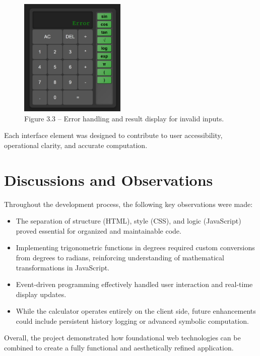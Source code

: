 \documentclass[a4paper,12pt,oneside]{report}
\numberwithin{equation}{chapter}
\numberwithin{figure}{chapter}
\numberwithin{table}{chapter}
\begin{document}
\begin{figure}[H]
    \centering
    \includegraphics[width=0.45\textwidth, keepaspectratio]{error_calc.png}
    \caption{Figure 3.3 – Error handling and result display for invalid inputs.}
    \label{fig:Calculator Error Display}
\end{figure}


Each interface element was designed to contribute to user accessibility, operational clarity, and accurate computation.

\bigskip
\noindent
\section{Discussions and Observations}

Throughout the development process, the following key observations were made:
\begin{itemize}
    \item The separation of structure (HTML), style (CSS), and logic (JavaScript) proved essential for organized and maintainable code.
    \item Implementing trigonometric functions in degrees required custom conversions from degrees to radians, reinforcing understanding of mathematical transformations in JavaScript.
    \item Event-driven programming effectively handled user interaction and real-time display updates.
    \item While the calculator operates entirely on the client side, future enhancements could include persistent history logging or advanced symbolic computation.
\end{itemize}

Overall, the project demonstrated how foundational web technologies can be combined to create a fully functional and aesthetically refined application.
\end{document}

